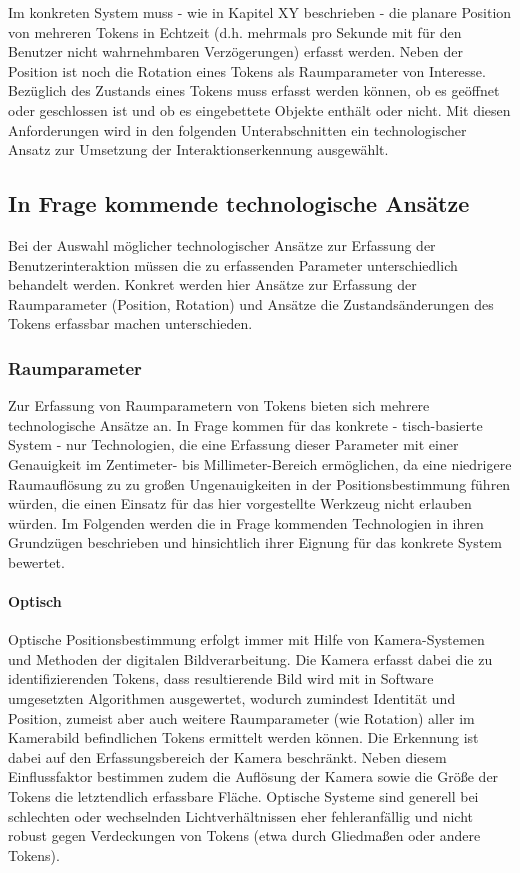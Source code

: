 Im konkreten System muss - wie in Kapitel XY beschrieben - die planare Position von mehreren Tokens in Echtzeit (d.h. mehrmals pro Sekunde mit für den Benutzer nicht wahrnehmbaren Verzögerungen) erfasst werden. Neben der Position ist noch die Rotation eines Tokens als Raumparameter von Interesse. Bezüglich des Zustands eines Tokens muss erfasst werden können, ob es geöffnet oder geschlossen ist und ob es eingebettete Objekte enthält oder nicht. Mit diesen Anforderungen wird in den folgenden Unterabschnitten ein technologischer Ansatz zur Umsetzung der Interaktionserkennung ausgewählt.

\subsection{In Frage kommende technologische Ansätze} %
\label{sub:potentielle_technologische_ansätze}
Bei der Auswahl möglicher technologischer Ansätze zur Erfassung der Benutzerinteraktion müssen die zu erfassenden Parameter unterschiedlich behandelt werden. Konkret werden hier Ansätze zur Erfassung der Raumparameter (Position, Rotation) und Ansätze die Zustandsänderungen des Tokens erfassbar machen unterschieden. 

\subsubsection{Raumparameter} %
\label{ssub:raumparameter}
Zur Erfassung von Raumparametern von Tokens bieten sich mehrere technologische Ansätze an. In Frage kommen für das konkrete - tisch-basierte System - nur Technologien, die eine Erfassung dieser Parameter mit einer Genauigkeit im Zentimeter- bis Millimeter-Bereich ermöglichen, da eine niedrigere Raumauflösung zu zu großen Ungenauigkeiten in der Positionsbestimmung führen würden, die einen Einsatz für das hier vorgestellte Werkzeug nicht erlauben würden. Im Folgenden werden die in Frage kommenden Technologien in ihren Grundzügen beschrieben und hinsichtlich ihrer Eignung für das konkrete System bewertet.

\paragraph{Optisch} %
\label{par:optisch}

Optische Positionsbestimmung erfolgt immer mit Hilfe von Kamera-Systemen und Methoden der digitalen Bildverarbeitung. Die Kamera erfasst dabei die zu identifizierenden Tokens, dass resultierende Bild wird mit in Software umgesetzten Algorithmen ausgewertet, wodurch zumindest Identität und Position, zumeist aber auch weitere Raumparameter (wie Rotation) aller im Kamerabild befindlichen Tokens ermittelt werden können. Die Erkennung ist dabei auf den Erfassungsbereich der Kamera beschränkt. Neben diesem Einflussfaktor bestimmen zudem die Auflösung der Kamera sowie die Größe der Tokens die letztendlich erfassbare Fläche. Optische Systeme sind generell bei schlechten oder wechselnden Lichtverhältnissen eher fehleranfällig und nicht robust gegen Verdeckungen von Tokens (etwa durch Gliedmaßen oder andere Tokens).

